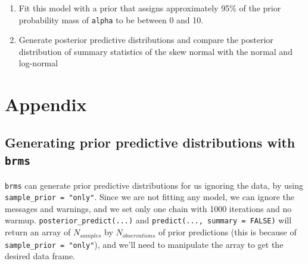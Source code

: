 \documentclass[12pt,]{krantz}
\providecommand{\tightlist}{%
  \setlength{\itemsep}{0pt}\setlength{\parskip}{0pt}}
\theoremstyle{definition}
\theoremstyle{definition}
\theoremstyle{definition}
\theoremstyle{remark}
\begin{document}
\begin{enumerate}
\def\labelenumi{\alph{enumi}.}
\tightlist
\item
  Fit this model with a prior that assigns approximately 95\% of the
  prior probability mass of \texttt{alpha} to be between 0 and 10.
\item
  Generate posterior predictive distributions and compare the posterior
  distribution of summary statistics of the skew normal with the normal
  and log-normal
\end{enumerate}

\section{Appendix}\label{appendix}

\subsection{\texorpdfstring{Generating prior predictive distributions
with
\texttt{brms}}{Generating prior predictive distributions with brms}}\label{app:pp}

\texttt{brms} can generate prior predictive distributions for us
ignoring the data, by using \texttt{sample\_prior\ =\ "only"}. Since we
are not fitting any model, we can ignore the messages and warnings, and
we set only one chain with 1000 iterations and no warmup.
\texttt{posterior\_predict(...)} and
\texttt{predict(...,\ summary\ =\ FALSE)} will return an array of
\(N_{samples}\) by \(N_{observations}\) of prior predictions (this is
because of \texttt{sample\_prior\ =\ "only"}), and we'll need to
manipulate the array to get the desired data frame.
\end{document}
